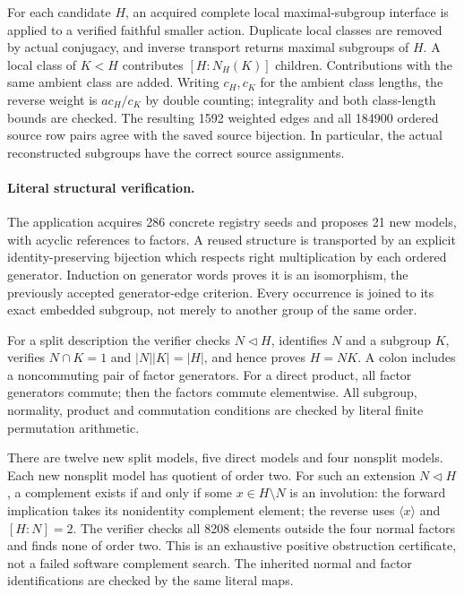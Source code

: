 \documentclass[11pt]{article}
\begin{document}
For each candidate $H$, an acquired complete local maximal-subgroup
interface is applied to a verified faithful smaller action. Duplicate local
classes are removed by actual conjugacy, and inverse transport returns
maximal subgroups of $H$. A local class of $K<H$ contributes
$[H:N_H(K)]$ children. Contributions with the same ambient class are added.
Writing $c_H,c_K$ for the ambient class lengths, the reverse weight is
$a c_H/c_K$ by double counting; integrality and both class-length bounds
are checked. The resulting 1592 weighted edges and all 184900 ordered
source row pairs agree with the saved source bijection. In particular,
the actual reconstructed subgroups have the correct source assignments.

\newpage
\paragraph{Literal structural verification.}
The application acquires 286 concrete registry seeds and proposes 21 new
models, with acyclic references to factors. A reused structure is transported
by an explicit identity-preserving bijection which respects right
multiplication by each ordered generator. Induction on generator words
proves it is an isomorphism, the previously accepted generator-edge
criterion. Every occurrence is joined to its exact embedded subgroup,
not merely to another group of the same order.

For a split description the verifier checks $N\triangleleft H$, identifies
$N$ and a subgroup $K$, verifies $N\cap K=1$ and $|N||K|=|H|$, and hence
proves $H=NK$. A colon includes a noncommuting pair of factor generators.
For a direct product, all factor generators commute; then the factors
commute elementwise. All subgroup, normality, product and commutation
conditions are checked by literal finite permutation arithmetic.

There are twelve new split models, five direct models and four nonsplit
models. Each new nonsplit model has quotient of order two. For such an
extension $N\triangleleft H$, a complement exists if and only if some
$x\in H\setminus N$ is an involution: the forward implication takes its
nonidentity complement element; the reverse uses $\langle x\rangle$ and
$[H:N]=2$. The verifier checks all 8208 elements outside the four normal factors and finds none
of order two. This is an exhaustive positive obstruction certificate,
not a failed software complement search. The inherited normal and factor
identifications are checked by the same literal maps.
\end{document}

